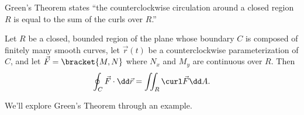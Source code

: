 Green's Theorem states ``the counterclockwise circulation around a closed region $R$ is equal to the sum of the curls over $R$.''

\begin{theorem}\label{thm:greens}
Let $R$ be a closed, bounded region of the plane whose boundary $C$ is composed of finitely many smooth curves, let $\vec r(t)$ be a counterclockwise parameterization of $C$, and let $\vec F =\bracket{M,N}$ where $N_x$ and $M_y$ are continuous over $R$. Then
\[\oint_C \vec F\cdot\dd\vec r = \iint_R\curl \vec F\dd A.\]
\end{theorem}


We'll explore Green's Theorem through an example.

